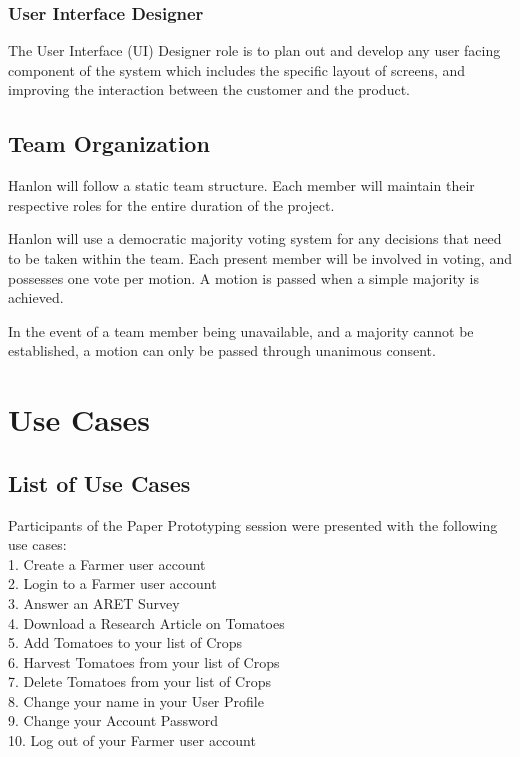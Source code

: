 \documentclass[12pt,letterpaper]{article}
\begin{document}
\subsubsection*{User Interface Designer}
The User Interface (UI) Designer role is to plan out and develop any user facing component of the system which includes the specific layout of screens, and improving the interaction between the customer and the product.

\subsection{Team Organization}
Hanlon will follow a static team structure. Each member will maintain their respective roles for the entire duration of the project. \par

Hanlon will use a democratic majority voting system for any decisions that need to be taken within the team. Each present member will be involved in voting, and possesses one vote per motion. A motion is passed when a simple majority is achieved. \par

In the event of a team member being unavailable, and a majority cannot be established, a motion can only be passed through unanimous consent.

\clearpage
\section{Use Cases}
\subsection{List of Use Cases}
Participants of the Paper Prototyping session were presented with the following use cases:\\
1.\hspace*{8pt} Create a Farmer user account\\
2.\hspace*{8pt} Login to a Farmer user account\\
3.\hspace*{8pt} Answer an ARET Survey\\
4.\hspace*{8pt} Download a Research Article on Tomatoes\\
5.\hspace*{8pt} Add Tomatoes to your list of Crops\\
6.\hspace*{8pt} Harvest Tomatoes from your list of Crops\\
7.\hspace*{8pt} Delete Tomatoes from your list of Crops\\
8.\hspace*{8pt} Change your name in your User Profile\\
9.\hspace*{8pt} Change your Account Password\\
10.\hspace*{3pt} Log out of your Farmer user account
\end{document}
